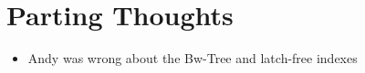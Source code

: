 \documentclass[11pt]{article}
\begin{document}
\section{Parting Thoughts}
\begin{itemize}
    \item Andy was wrong about the Bw-Tree and latch-free indexes
\end{itemize}



\newpage


\end{document}
